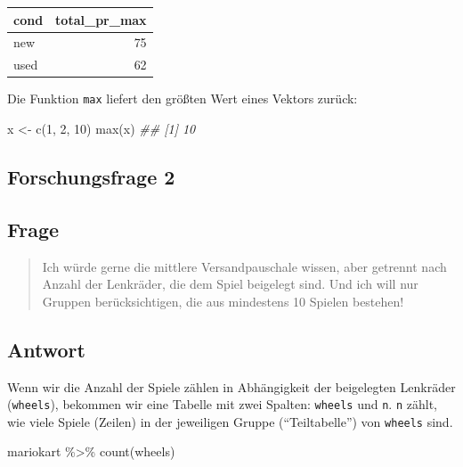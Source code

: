 \documentclass[
  a4paper,
  DIV=11]{scrreprt}
\newenvironment{Shaded}{\begin{snugshade}}{\end{snugshade}}
\newcommand{\DecValTok}[1]{\textcolor[rgb]{0.68,0.00,0.00}{#1}}
\newcommand{\DocumentationTok}[1]{\textcolor[rgb]{0.37,0.37,0.37}{\textit{#1}}}
\newcommand{\FunctionTok}[1]{\textcolor[rgb]{0.28,0.35,0.67}{#1}}
\newcommand{\NormalTok}[1]{\textcolor[rgb]{0.00,0.23,0.31}{#1}}
\newcommand{\OtherTok}[1]{\textcolor[rgb]{0.00,0.23,0.31}{#1}}
\newcommand{\SpecialCharTok}[1]{\textcolor[rgb]{0.37,0.37,0.37}{#1}}
\theoremstyle{definition}
\theoremstyle{definition}
\theoremstyle{definition}
\theoremstyle{remark}
\begin{document}
\begin{longtable}[]{@{}lr@{}}
\toprule\noalign{}
cond & total\_pr\_max \\
\midrule\noalign{}
\endhead
\bottomrule\noalign{}
\endlastfoot
new & 75 \\
used & 62 \\
\end{longtable}

Die Funktion \texttt{max} liefert den größten Wert eines Vektors zurück:

\begin{Shaded}
\begin{Highlighting}[]
\NormalTok{x }\OtherTok{\textless{}{-}} \FunctionTok{c}\NormalTok{(}\DecValTok{1}\NormalTok{, }\DecValTok{2}\NormalTok{, }\DecValTok{10}\NormalTok{)}
\FunctionTok{max}\NormalTok{(x)}
\DocumentationTok{\#\# [1] 10}
\end{Highlighting}
\end{Shaded}

\subsection{Forschungsfrage 2}\label{forschungsfrage-2-1}

\subsection{Frage}

\begin{quote}
{} Ich würde gerne die mittlere Versandpauschale wissen,
aber getrennt nach Anzahl der Lenkräder, die dem Spiel beigelegt sind.
Und ich will nur Gruppen berücksichtigen, die aus mindestens 10 Spielen
bestehen!
\end{quote}

\subsection{Antwort}

Wenn wir die Anzahl der Spiele zählen in Abhängigkeit der beigelegten
Lenkräder (\texttt{wheels}), bekommen wir eine Tabelle mit zwei Spalten:
\texttt{wheels} und \texttt{n}. \texttt{n} zählt, wie viele Spiele
(Zeilen) in der jeweiligen Gruppe (``Teiltabelle'') von \texttt{wheels}
sind.

\begin{Shaded}
\begin{Highlighting}[]
\NormalTok{mariokart }\SpecialCharTok{\%\textgreater{}\%}
  \FunctionTok{count}\NormalTok{(wheels)}
\end{Highlighting}
\end{Shaded}
\end{document}
